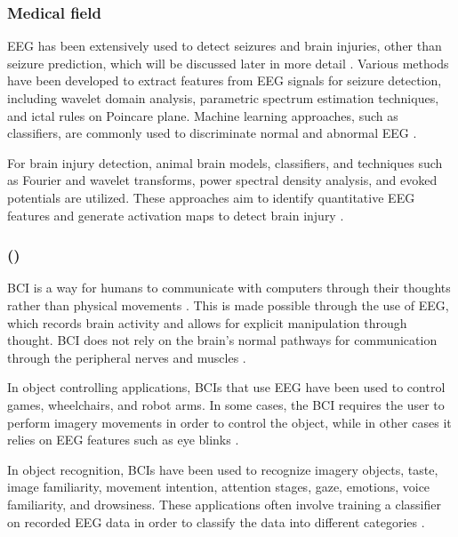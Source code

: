 \subsubsection{Medical field}
\gls{EEG} has been extensively used to detect seizures and brain injuries, other than seizure prediction, which will be discussed later in more detail \cite{lai_literature_2018}. 
Various methods have been developed to extract features from \gls{EEG} signals for seizure detection, including wavelet domain analysis, parametric spectrum estimation techniques, and ictal rules on Poincare plane. Machine learning approaches, such as classifiers, are commonly used to discriminate normal and abnormal \gls{EEG} \cite{sharmila_epilepsy_2018}. 

For brain injury detection, animal brain models, classifiers, and techniques such as Fourier and wavelet transforms, power spectral density analysis, and evoked potentials are utilized. These approaches aim to identify quantitative \gls{EEG} features and generate activation maps to detect brain injury \cite{ianof_traumatic_2017, rapp_traumatic_2015}.


\subsubsection{  ()}
\gls{BCI} is a way for humans to communicate with computers through their thoughts rather than physical movements \cite{lai_literature_2018}. This is made possible through the use of \gls{EEG}, which records brain activity and allows for explicit manipulation through thought. \gls{BCI} does not rely on the brain's normal pathways for communication through the peripheral nerves and muscles \cite{machado_eeg-based_2010}.

In object controlling applications, \glspl{BCI} that use \gls{EEG} have been used to control games, wheelchairs, and robot arms. In some cases, the \gls{BCI} requires the user to perform imagery movements in order to control the object, while in other cases it relies on \gls{EEG} features such as eye blinks \cite{huang_review_2021, liao_gaming_2012, al-qaysi_review_2018}.

In object recognition, \glspl{BCI} have been used to recognize imagery objects, taste, image familiarity, movement intention, attention stages, gaze, emotions, voice familiarity, and drowsiness. These applications often involve training a classifier on recorded \gls{EEG} data in order to classify the data into different categories \cite{mohedano_exploring_2015}.

